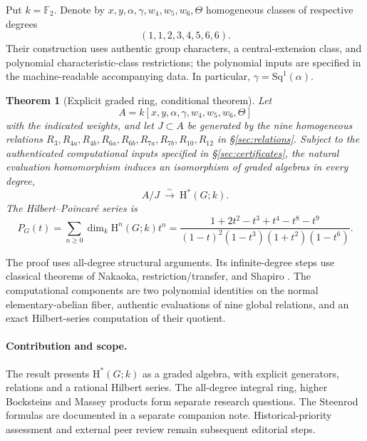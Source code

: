 \documentclass[11pt,a4paper]{article}
\newtheorem{theorem}{Theorem}[section]
\theoremstyle{remark}\newtheorem{remark}[theorem]{Remark}
\newcommand{\F}{\mathbb F}
\newcommand{\HH}{\mathrm H}
\begin{document}
Put \(k=\F_2\). Denote by \(x,y,\alpha,\gamma,w_4,w_5,w_6,\Theta\) homogeneous classes of respective degrees
\[
(1,1,2,3,4,5,6,6).
\]
Their construction uses authentic group characters, a central-extension class, and polynomial characteristic-class restrictions; the polynomial inputs are specified in the machine-readable accompanying data. In particular, \(\gamma=\mathrm{Sq}^1(\alpha)\).

\begin{theorem}[Explicit graded ring, conditional theorem]\label{thm:ring}
Let
\[
A=k[x,y,\alpha,\gamma,w_4,w_5,w_6,\Theta]
\]
with the indicated weights, and let \(J\subset A\) be generated by the nine homogeneous relations \(R_3,R_{4a},R_{4b},R_{6a},R_{6b},R_{7a},R_{7b},R_{10},R_{12}\) in \S\ref{sec:relations}. Subject to the authenticated computational inputs specified in \S\ref{sec:certificates}, the natural evaluation homomorphism induces an isomorphism of \emph{graded algebras in every degree},
\begin{equation}\label{eq:main}
A/J\ \xrightarrow{\ \sim\ }\ \HH^*(G;k).
\end{equation}
The Hilbert--Poincar\'e series is
\begin{equation}\label{eq:hilbert}
\boxed{\quad
P_G(t)=\sum_{n\ge0}\dim_k\HH^n(G;k)t^n
=\frac{1+2t^2-t^3+t^4-t^8-t^9}
{(1-t)^2(1-t^3)(1+t^2)(1-t^6)}.\quad}
\end{equation}
\end{theorem}

The proof uses all-degree structural arguments. Its infinite-degree steps use classical theorems of Nakaoka, restriction/transfer, and Shapiro \cite{nakaoka,brown,cts}. The computational components are two polynomial identities on the normal elementary-abelian fiber, authentic evaluations of nine global relations, and an exact Hilbert-series computation of their quotient.

\paragraph{Contribution and scope.}
The result presents \(\HH^*(G;k)\) as a graded algebra, with explicit generators, relations and a rational Hilbert series. The all-degree integral ring, higher Bocksteins and Massey products form separate research questions. The Steenrod formulas are documented in a separate companion note. Historical-priority assessment and external peer review remain subsequent editorial steps.
\end{document}

